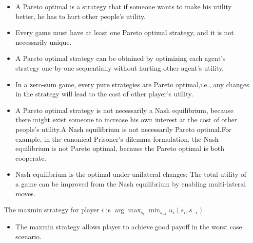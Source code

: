 \begin{refsection}
\begin{remark}\hfill
\begin{itemize}
    \item A Pareto optimal is a strategy that if someone wants to make his utility better, he has to hurt other people's utility.
    \item Every game must have at least one Pareto optimal strategy, and it is not necessarily unique.
    \item A Pareto optimal strategy can be obtained by optimizing each agent's strategy one-by-one sequentially without hurting other agent's utility.
    \item In a zero-sum game, every pure strategies are Pareto optimal,i.e., any changes in the strategy will lead to the cost of other player's utility.
\end{itemize}
\end{remark}

\begin{remark} \hfill
\begin{itemize}
    \item A Pareto optimal strategy is not necessarily a Nash equilibrium, because there might exist someone to increase his own interest at the cost of other people's utility.A Nash equilibrium is not necessarily Pareto optimal.For example, in the canonical Prisoner's dilemma formulation, the Nash equilibrium is not Pareto optimal, because the Pareto optimal is both cooperate. 
    \item Nash equilibrium is the optimal under unilateral changes; The total utility of a game can be improved from the Nash equilibrium by enabling multi-lateral moves.
\end{itemize}
 
\end{remark}

\begin{definition}
\cite[15]{leyton2008essentials} The maxmin strategy for player $i$ is $\arg \max_{s_i}\min_{s_{-i}} u_i(s_i,s_{-i})$
\end{definition}

\begin{remark}\hfill
\begin{itemize}
    \item The maxmin strategy allows player to achieve good payoff in the worst case scenario.
\end{itemize}
\end{remark}



\end{refsection}
